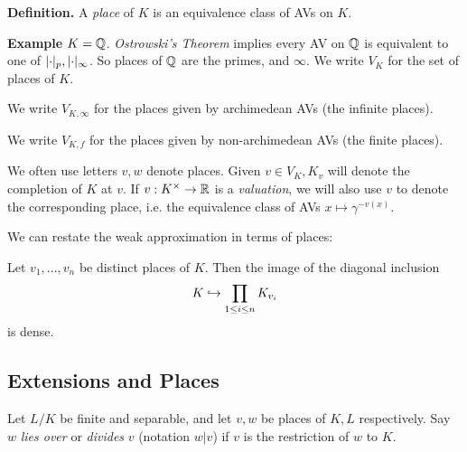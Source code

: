 \documentclass[10pt,a4paper]{article}
\begin{document}
\textbf{Definition.}  A \emph{place} of $K$ is an equivalence class of AVs on $K$.

\textbf{Example} $K=\mathbb{Q}$. \emph{Ostrowski's Theorem} implies every AV on $\mathbb{Q}$ is equivalent to one of $\lvert\cdot\rvert_p, \lvert\cdot\rvert_\infty$. So places of $\mathbb{Q}$ are the primes, and $\infty$. We write $V_K$ for the set of places of $K$.

We write $V_{K, \infty}$ for the places given by archimedean AVs (the infinite places).

We write $V_{K,f}$ for the places given by non-archimedean AVs (the finite places).

We often use letters $v, w$ denote places. Given $v \in V_K, K_v$ will denote the completion of $K$ at $v$. If $v:K^\times \to \mathbb{R}$ is a \emph{valuation}, we will also use $v$ to denote the corresponding place, i.e. the equivalence class of AVs $x \mapsto \gamma^{-v(x)}$.

We can restate the weak approximation in terms of places:
\addtocounter{theorem}{-1}
\begin{proposition}
  Let $v_1, \ldots, v_n$ be distinct places of $K$. Then the image of the diagonal inclusion
  \[ K \hookrightarrow \prod_{1\leq i\leq n}K_{v_i}\]
  is dense.
\end{proposition}
\subsection{Extensions and Places}
Let $L/K$ be finite and separable, and let $v, w$ be places of $K, L$ respectively. Say $w$ \emph{lies over} or \emph{divides} $v$ (notation $w|v$) if $v$ is the restriction of $w$ to $K$.
\end{document}

